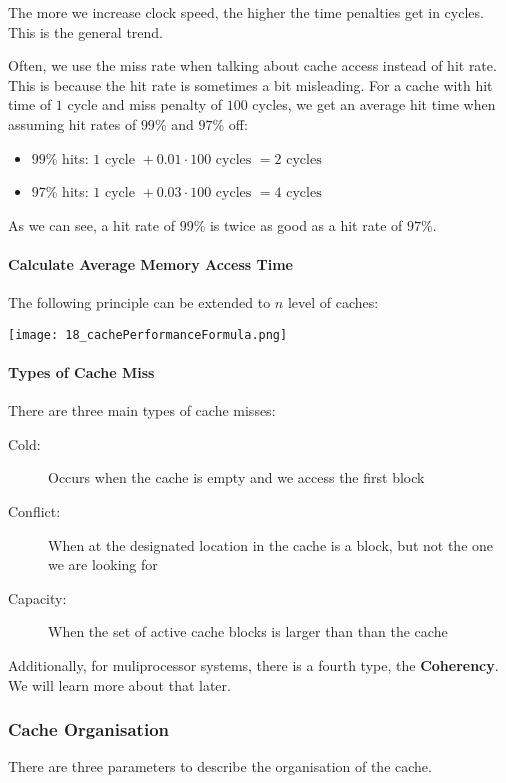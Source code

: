 The more we increase clock speed, the higher the time penalties get in cycles. This is the general trend.

Often, we use the miss rate when talking about cache access instead of hit rate. This is because the hit rate is sometimes a bit misleading. For a cache with hit time of $1$ cycle and miss penalty of $100$ cycles, we get an average hit time when assuming hit rates of $99$\% and $97$\% off:
\begin{itemize}
    \item $99$\% hits: $1 \text{ cycle } + 0.01 \cdot 100 \text{ cycles } = 2 \text{ cycles}$
    \item $97$\% hits: $1 \text{ cycle } + 0.03 \cdot 100 \text{ cycles } = 4 \text{ cycles}$
\end{itemize}

As we can see, a hit rate of $99$\% is twice as good as a hit rate of $97$\%.

\paragraph{Calculate Average Memory Access Time}
The following principle can be extended to $n$ level of caches:

\texttt{[image: 18\_cachePerformanceFormula.png]}

\paragraph{Types of Cache Miss}
There are three main types of cache misses:

\begin{description}
    \item[Cold:] Occurs when the cache is empty and we access the first block
    \item[Conflict:] When at the designated location in the cache is a block, but not the one we are looking for
    \item[Capacity:] When the set of active cache blocks is larger than than the cache
\end{description}
Additionally, for muliprocessor systems, there is a fourth type, the \textbf{Coherency}. We will learn more about that later.

\subsubsection{Cache Organisation}

There are three parameters to describe the organisation of the cache.

